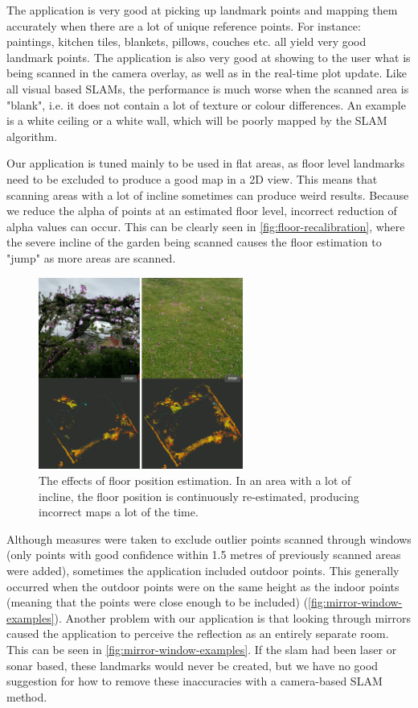 \documentclass{article}
\begin{document}
The application is very good at picking up landmark points and mapping them accurately when there are a lot of unique reference points. For instance: paintings, kitchen tiles, blankets, pillows, couches etc. all yield very good landmark points. The application is also very good at showing to the user what is being scanned in the camera overlay, as well as in the real-time plot update. Like all visual based SLAMs, the performance is much worse when the scanned area is "blank", i.e. it does not contain a lot of texture or colour differences. An example is a white ceiling or a white wall, which will be poorly mapped by the SLAM algorithm.

Our application is tuned mainly to be used in flat areas, as floor level landmarks need to be excluded to produce a good map in a 2D view. This means that scanning areas with a lot of incline sometimes can produce weird results. Because we reduce the alpha of points at an estimated floor level, incorrect reduction of alpha values can occur. This can be clearly seen in \autoref{fig:floor-recalibration}, where the severe incline of the garden being scanned causes the floor estimation to "jump" as more areas are scanned. 

\begin{figure}[!htb]
    \centering
    \includegraphics[width=0.6\textwidth]{floor-recalibration.png}
    \caption{The effects of floor position estimation. In an area with a lot of incline, the floor position is continuously re-estimated, producing incorrect maps a lot of the time.}
    \label{fig:floor-recalibration}
\end{figure}

Although measures were taken to exclude outlier points scanned through windows (only points with good confidence within 1.5 metres of previously scanned areas were added), sometimes the application included outdoor points. This generally occurred when the outdoor points were on the same height as the indoor points (meaning that the points were close enough to be included) (\autoref{fig:mirror-window-examples}). Another problem with our application is that looking through mirrors caused the application to perceive the reflection as an entirely separate room. This can be seen in \autoref{fig:mirror-window-examples}. If the slam had been laser or sonar based, these landmarks would never be created, but we have no good suggestion for how to remove these inaccuracies with a camera-based SLAM method.
\end{document}
